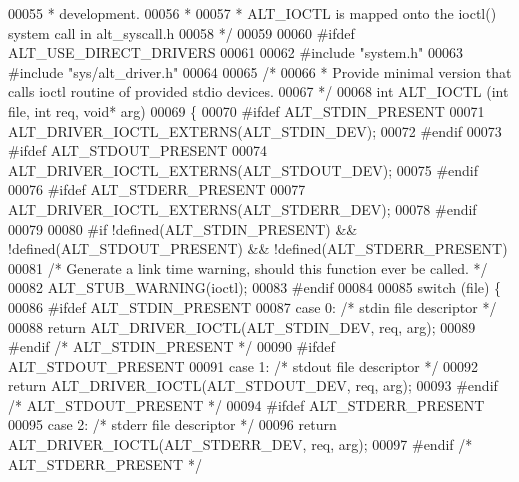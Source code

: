 \begin{DoxyCode}
00055 \textcolor{comment}{ * development. }
00056 \textcolor{comment}{ *}
00057 \textcolor{comment}{ * ALT\_IOCTL is mapped onto the ioctl() system call in alt\_syscall.h }
00058 \textcolor{comment}{ */}
00059  
00060 \textcolor{preprocessor}{#ifdef ALT\_USE\_DIRECT\_DRIVERS}
00061 
00062 \textcolor{preprocessor}{#include "system.h"}
00063 \textcolor{preprocessor}{#include "sys/alt_driver.h"}
00064 
00065 \textcolor{comment}{/*}
00066 \textcolor{comment}{ * Provide minimal version that calls ioctl routine of provided stdio devices.}
00067 \textcolor{comment}{ */}
00068 \textcolor{keywordtype}{int} ALT_IOCTL (\textcolor{keywordtype}{int} file, \textcolor{keywordtype}{int} req, \textcolor{keywordtype}{void}* arg)
00069 \{
00070 \textcolor{preprocessor}{#ifdef ALT\_STDIN\_PRESENT}
00071     ALT_DRIVER_IOCTL_EXTERNS(ALT_STDIN_DEV);
00072 \textcolor{preprocessor}{#endif}
00073 \textcolor{preprocessor}{#ifdef ALT\_STDOUT\_PRESENT}
00074     ALT_DRIVER_IOCTL_EXTERNS(ALT_STDOUT_DEV);
00075 \textcolor{preprocessor}{#endif}
00076 \textcolor{preprocessor}{#ifdef ALT\_STDERR\_PRESENT}
00077     ALT_DRIVER_IOCTL_EXTERNS(ALT_STDERR_DEV);
00078 \textcolor{preprocessor}{#endif}
00079 
00080 \textcolor{preprocessor}{#if !defined(ALT\_STDIN\_PRESENT) && !defined(ALT\_STDOUT\_PRESENT) && !defined(ALT\_STDERR\_PRESENT)}
00081     \textcolor{comment}{/* Generate a link time warning, should this function ever be called. */}
00082     ALT_STUB_WARNING(ioctl);
00083 \textcolor{preprocessor}{#endif}
00084 
00085     \textcolor{keywordflow}{switch} (file) \{
00086 \textcolor{preprocessor}{#ifdef ALT\_STDIN\_PRESENT}
00087     \textcolor{keywordflow}{case} 0: \textcolor{comment}{/* stdin file descriptor */}
00088         \textcolor{keywordflow}{return} ALT_DRIVER_IOCTL(ALT_STDIN_DEV, req, arg);
00089 \textcolor{preprocessor}{#endif }\textcolor{comment}{/* ALT\_STDIN\_PRESENT */}\textcolor{preprocessor}{}
00090 \textcolor{preprocessor}{#ifdef ALT\_STDOUT\_PRESENT}
00091     \textcolor{keywordflow}{case} 1: \textcolor{comment}{/* stdout file descriptor */}
00092         \textcolor{keywordflow}{return} ALT_DRIVER_IOCTL(ALT_STDOUT_DEV, req, arg);
00093 \textcolor{preprocessor}{#endif }\textcolor{comment}{/* ALT\_STDOUT\_PRESENT */}\textcolor{preprocessor}{}
00094 \textcolor{preprocessor}{#ifdef ALT\_STDERR\_PRESENT}
00095     \textcolor{keywordflow}{case} 2: \textcolor{comment}{/* stderr file descriptor */}
00096         \textcolor{keywordflow}{return} ALT_DRIVER_IOCTL(ALT_STDERR_DEV, req, arg);
00097 \textcolor{preprocessor}{#endif }\textcolor{comment}{/* ALT\_STDERR\_PRESENT */}\textcolor{preprocessor}{}

\end{DoxyCode}
